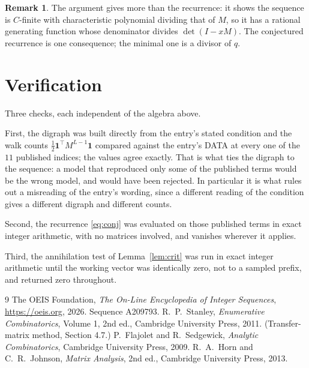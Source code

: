 \documentclass[11pt,a4paper]{article}
\theoremstyle{plain}
\theoremstyle{definition}
\newtheorem{remark}[theorem]{Remark}
\begin{document}
\begin{remark}
The argument gives more than the recurrence: it shows the sequence is $C$-finite with
characteristic polynomial dividing that of $M$, so it has a rational generating function
whose denominator divides $\det(I-xM)$. The conjectured recurrence is one consequence; the
minimal one is a divisor of $q$.
\end{remark}

\section{Verification}

Three checks, each independent of the algebra above.

First, the digraph was built directly from the entry's stated condition and the walk counts
$\tfrac1{2}\mathbf{1}^{\!\top}M^{L-1}\mathbf{1}$ compared against the entry's DATA at
every one of the $11$ published indices; the values agree exactly. That is what ties
the digraph to the sequence: a model that reproduced only some of the published terms would
be the wrong model, and would have been rejected. In particular it is what rules out a
misreading of the entry's wording, since a different reading of the condition gives a
different digraph and different counts.

Second, the recurrence \eqref{eq:conj} was evaluated on those published terms in exact
integer arithmetic, with no matrices involved, and vanishes wherever it applies.

Third, the annihilation test of Lemma~\ref{lem:crit} was run in exact integer arithmetic
until the working vector was identically zero, not to a sampled prefix, and returned zero
throughout.

\begin{thebibliography}{9}
 The OEIS Foundation, \emph{The On-Line Encyclopedia of Integer
Sequences}, \url{https://oeis.org}, 2026. Sequence A209793.
 R.~P.~Stanley, \emph{Enumerative Combinatorics}, Volume 1, 2nd ed.,
Cambridge University Press, 2011. (Transfer-matrix method, Section 4.7.)
 P.~Flajolet and R.~Sedgewick, \emph{Analytic Combinatorics}, Cambridge
University Press, 2009.
 R.~A.~Horn and C.~R.~Johnson, \emph{Matrix Analysis}, 2nd ed., Cambridge
University Press, 2013.
\end{thebibliography}
\end{document}
